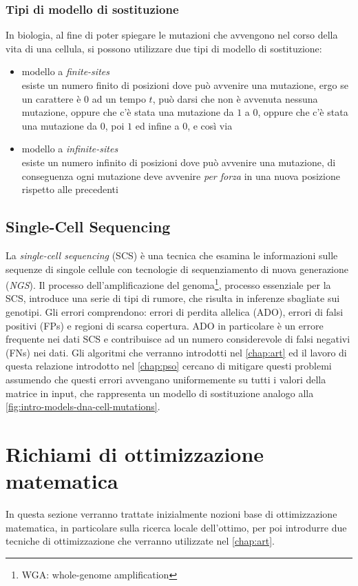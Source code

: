 \subsubsection{Tipi di modello di sostituzione}
\label{chap:intro-models-types}
In biologia, al fine di poter spiegare le mutazioni che avvengono nel corso della vita di una cellula, si possono utilizzare due tipi di modello di sostituzione:
\begin{itemize}
    \item modello a \textit{finite-sites} \\ esiste un numero finito di posizioni dove può avvenire una mutazione, ergo se un carattere è $0$ ad un tempo $t$, può darsi che non è avvenuta nessuna mutazione, oppure che c'è stata una mutazione da $1$ a $0$, oppure che c'è stata una mutazione da $0$, poi $1$ ed infine a $0$, e così via
    \item modello a \textit{infinite-sites} \\ esiste un numero infinito di posizioni dove può avvenire una mutazione, di conseguenza ogni mutazione deve avvenire \textit{per forza} in una nuova posizione rispetto alle precedenti
\end{itemize}

\subsection{Single-Cell Sequencing}
\label{chap:intro-scs}
La \textit{single-cell sequencing} (SCS) è una tecnica che esamina le informazioni sulle sequenze di singole cellule con tecnologie di sequenziamento di nuova generazione (\textit{NGS}). Il processo dell'amplificazione del genoma\footnote{WGA: whole-genome amplification}, processo essenziale per la SCS, introduce una serie di tipi di rumore, che risulta in inferenze sbagliate sui genotipi. Gli errori comprendono: errori di perdita allelica (ADO), errori di falsi positivi (FPs) e regioni di scarsa copertura. ADO in particolare è un errore frequente nei dati SCS e contribuisce ad un numero considerevole di falsi negativi (FNs) nei dati. Gli algoritmi che verranno introdotti nel \autoref{chap:art} ed il lavoro di questa relazione introdotto nel \autoref{chap:pso} cercano di mitigare questi problemi assumendo che questi errori avvengano uniformemente su tutti i valori della matrice in input, che rappresenta un modello di sostituzione analogo alla \autoref{fig:intro-models-dna-cell-mutations}.

\section{Richiami di ottimizzazione matematica}
\label{chap:intro-optim}
In questa sezione verranno trattate inizialmente nozioni base di ottimizzazione matematica, in particolare sulla ricerca locale dell'ottimo, per poi introdurre due tecniche di ottimizzazione che verranno utilizzate nel \autoref{chap:art}.

